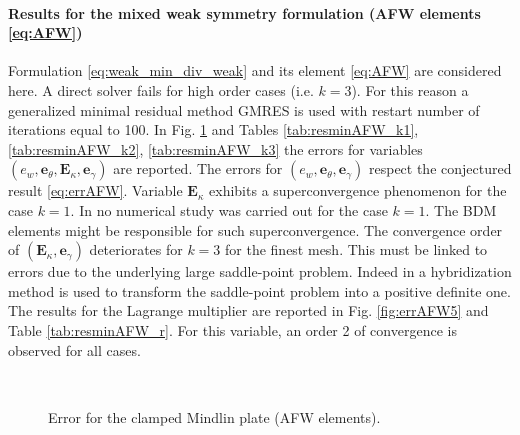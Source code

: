\paragraph{Results for the mixed weak symmetry formulation (AFW elements \eqref{eq:AFW})} 
Formulation \eqref{eq:weak_min_div_weak} and its element \eqref{eq:AFW} are considered here. A direct solver fails for high order cases (i.e. $k=3$). For this reason a generalized minimal residual method GMRES \cite{saad1986gmres} is used with restart number of iterations equal to 100. In Fig. \ref{fig:errorAFW} and Tables \ref{tab:resminAFW_k1}, \ref{tab:resminAFW_k2}, \ref{tab:resminAFW_k3} the errors for variables $(e_w, \bm{e}_\theta, \bm{E}_\kappa, \bm{e}_\gamma)$  are reported. The errors for $(e_w, \bm{e}_\theta, \bm{e}_\gamma)$ respect the conjectured result \eqref{eq:errAFW}. Variable $\bm{E}_\kappa$ exhibits a superconvergence phenomenon for the case $k=1$. In \cite{arnold2014elastodynamics} no numerical study was carried out for the case $k=1$. The BDM elements might be responsible for such superconvergence. The convergence order of $(\bm{E}_\kappa, \bm{e}_\gamma)$ deteriorates for $k=3$ for the finest mesh. This must be linked to errors due to the underlying large saddle-point problem. Indeed in \cite{arnold2014elastodynamics} a hybridization method is used to transform the saddle-point problem into a positive definite one. The results for the Lagrange multiplier are reported in Fig. \ref{fig:errAFW5} and Table \ref{tab:resminAFW_r}. For this variable, an order 2 of convergence is observed for all cases.

\begin{figure}[htbp]%
	\centering
	\hspace{8pt}%
	 \\
	\hspace{8pt}%
	\caption{Error for the clamped Mindlin plate (AFW elements).}%
	\label{fig:errorAFW}%
\end{figure}





